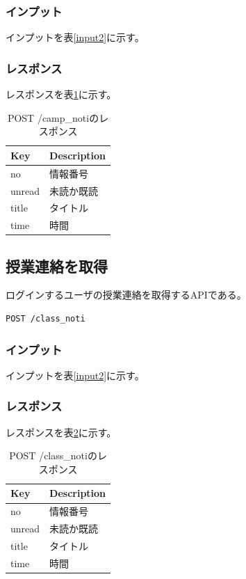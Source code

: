 \documentclass[a4j,12pt,onecolumn,oneside,titlepage,openany,final]{jreport}
\begin{document}
\subsubsection{インプット}
インプットを表\ref{input2}に示す。
\subsubsection{レスポンス}
レスポンスを表\ref{camp}に示す。
\begin{table}[htbp]
\caption{POST /camp\_notiのレスポンス}
\centering
\begin{tabular}{|l|l|}
\hline
Key                    & Description                    \\ \hline
 no & 情報番号                             \\ \hline
unread & 未読か既読                               \\ \hline
 title & タイトル                                 \\ \hline
  time & 時間                             \\ \hline

\end{tabular}
\label{camp}
\end{table}
\subsection{授業連絡を取得}
ログインするユーザの授業連絡を取得するAPIである。
\begin{lstlisting}[language=http, firstnumber=1]
POST /class_noti
\end{lstlisting}

\subsubsection{インプット}
インプットを表\ref{input2}に示す。
\subsubsection{レスポンス}
レスポンスを表\ref{class}に示す。

\begin{table}[htbp]
\caption{POST /class\_notiのレスポンス}
\centering
\begin{tabular}{|l|l|}
\hline
Key                    & Description                    \\ \hline
 no & 情報番号                             \\ \hline
unread & 未読か既読                               \\ \hline
 title & タイトル                                 \\ \hline
  time & 時間                             \\ \hline

\end{tabular}
\label{class}
\end{table}
\end{document}
